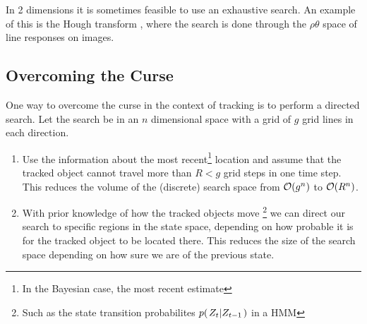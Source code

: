 \begin{example} In 2 dimensions it is sometimes feasible to use an
exhaustive search.  An example of this is the Hough transform
\cite{DigitalImageProcessing}, where the search is done through the
$\rho\theta$ space of line responses on images.
\end{example}

\subsection{Overcoming the Curse} One way to overcome the curse in the
context of tracking is to perform a directed search. Let the search be
in an $n$ dimensional space with a grid of $g$ grid lines in each
direction.

\begin{enumerate}
\item Use the information about the most recent\footnote{In the
    Bayesian case, the most recent estimate} location and assume that
  the tracked object cannot travel more than $R < g$ grid steps in one
  time step.  This reduces the volume of the (discrete) search space
  from $\mathcal{O}{\left(g^n\right)}$ to $\mathcal{O}{\left(R^n\right)}$.
\item With prior knowledge of how the tracked objects move
  \footnote{Such as the state transition probabilites $p{(\left. Z_t \middle\vert Z_{t-1} \right.)}$
    in a HMM} we can direct our search to specific regions in the
  state space, depending on how probable it is for the tracked object
  to be located there. This reduces the size of the search space
  depending on how sure we are of the previous state.
\end{enumerate}



